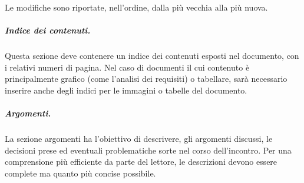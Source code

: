 Le modifiche sono riportate, nell'ordine, dalla più vecchia alla più nuova.
\subparagraph{Indice dei contenuti.}
Questa sezione deve contenere un indice dei contenuti esposti nel documento, con i relativi numeri di pagina. Nel caso di documenti il cui contenuto è principalmente grafico (come l'analisi dei requisiti) o tabellare, sarà necessario inserire anche degli indici per le immagini o tabelle del documento.
\subparagraph{Argomenti.}
La sezione argomenti ha l'obiettivo di descrivere, gli argomenti discussi, le decisioni prese ed eventuali problematiche sorte nel corso dell'incontro. Per una comprensione più efficiente da parte del lettore, le descrizioni devono essere complete ma quanto più concise possibile.

